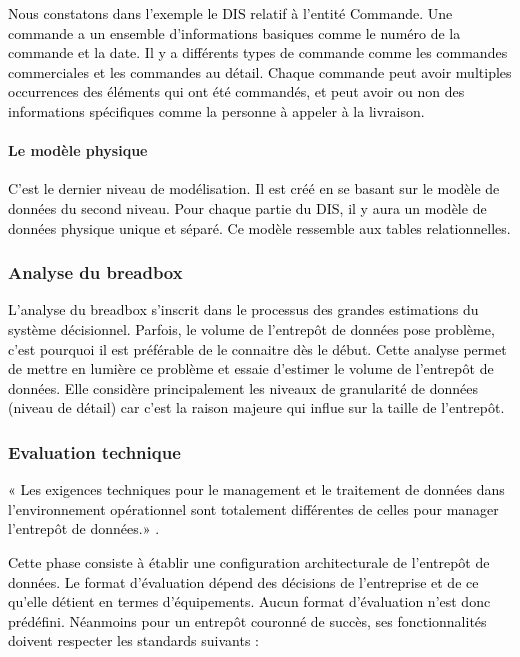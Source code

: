 \documentclass[a4paper,12pt]{report}
\begin{document}
\textcolor{black}{Nous constatons dans l’exemple le DIS relatif à l’entité Commande. Une commande a un ensemble d’informations basiques comme le numéro de la commande et la date. Il y a différents types de commande comme les commandes commerciales et les commandes au détail. Chaque commande peut avoir multiples occurrences des éléments qui ont été commandés, et peut avoir ou non des informations spécifiques comme la personne à appeler à la livraison.}

\paragraph{Le modèle physique}
	
\textcolor{black}{C’est le dernier niveau de modélisation. Il est créé en se basant sur le modèle de données du second niveau. Pour chaque partie du DIS, il y aura un modèle de données physique unique et séparé. Ce modèle ressemble aux tables relationnelles.}

\subsubsection{Analyse du breadbox}

\textcolor{black}{L’analyse du breadbox s’inscrit dans le processus des grandes estimations du système décisionnel. Parfois, le volume de l’entrepôt de données pose problème, c’est pourquoi il est préférable de le connaitre dès le début. Cette analyse permet de mettre en lumière ce problème et essaie d’estimer le volume de l’entrepôt de données. Elle considère principalement les niveaux de granularité de données (niveau de détail) car c’est la raison majeure qui influe sur la taille de l’entrepôt.}

\subsubsection{Evaluation technique }

\textcolor{black}{« Les exigences techniques pour le management et le traitement de données dans l’environnement opérationnel sont totalement différentes de celles pour manager l’entrepôt de données.» \citep{inmon2002building}.}

\textcolor{black}{
Cette phase consiste à établir une configuration architecturale de l’entrepôt de données. Le format d’évaluation dépend des décisions de l’entreprise et de ce qu’elle détient en termes d’équipements. Aucun format d’évaluation n’est donc prédéfini. Néanmoins pour un entrepôt couronné de succès, ses fonctionnalités doivent respecter les standards suivants :
}
\end{document}
